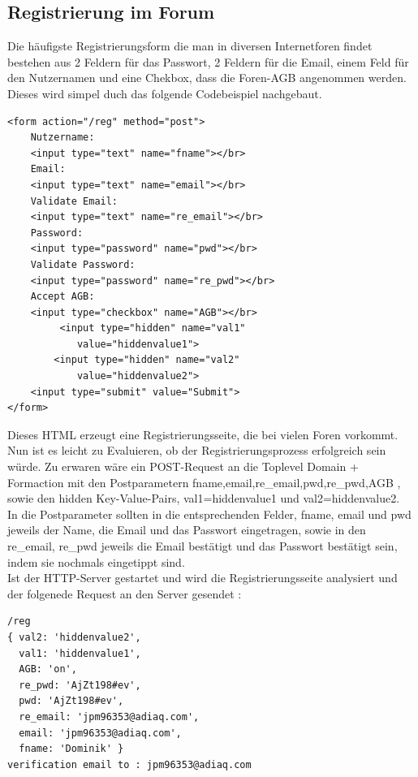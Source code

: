\subsection{Registrierung im Forum}
Die häufigste Registrierungsform die man in diversen Internetforen findet bestehen aus 2 Feldern für das Passwort, 2 Feldern für die Email, einem Feld für den Nutzernamen und eine Chekbox, dass die Foren-AGB angenommen werden. Dieses wird simpel duch das folgende Codebeispiel nachgebaut.

\begin{lstlisting}[language=HTML5]
<form action="/reg" method="post">
	Nutzername: 
	<input type="text" name="fname"></br>
	Email: 
	<input type="text" name="email"></br>
	Validate Email: 
	<input type="text" name="re_email"></br>
	Password: 
	<input type="password" name="pwd"></br>
	Validate Password: 
	<input type="password" name="re_pwd"></br>
	Accept AGB:
	<input type="checkbox" name="AGB"></br>
 		 <input type="hidden" name="val1" 
            value="hiddenvalue1">
  		<input type="hidden" name="val2" 
            value="hiddenvalue2">
	<input type="submit" value="Submit">
</form>
\end{lstlisting}
\newpage

Dieses HTML erzeugt eine Registrierungsseite, die bei vielen Foren vorkommt. Nun ist es leicht zu Evaluieren, ob der Registrierungsprozess erfolgreich sein würde. Zu erwaren wäre ein POST-Request an die Toplevel Domain + Formaction mit den Postparametern fname,email,re\_email,pwd,re\_pwd,AGB , sowie den hidden Key-Value-Pairs, val1=hiddenvalue1 und val2=hiddenvalue2.\\
In die Postparameter sollten in die entsprechenden Felder, fname, email und pwd jeweils der Name, die Email und das Passwort eingetragen, sowie in den re\_email, re\_pwd jeweils die Email bestätigt und das Passwort bestätigt sein, indem sie nochmals eingetippt sind.\\
Ist der HTTP-Server gestartet und wird die Registrierungsseite analysiert und der folgenede Request an den Server gesendet :\\

\begin{lstlisting}[language=HTML5]
/reg
{ val2: 'hiddenvalue2',
  val1: 'hiddenvalue1',
  AGB: 'on',
  re_pwd: 'AjZt198#ev',
  pwd: 'AjZt198#ev',
  re_email: 'jpm96353@adiaq.com',
  email: 'jpm96353@adiaq.com',
  fname: 'Dominik' }
verification email to : jpm96353@adiaq.com
\end{lstlisting}

